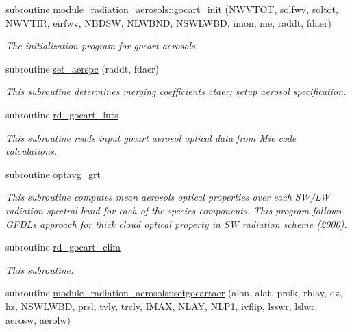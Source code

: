 \textbf{ }\par
\begin{DoxyCompactItemize}
\item 
subroutine \hyperlink{group__module__radiation__aerosols_ga579538840d4d8c86efa155b788c14ae3}{module\+\_\+radiation\+\_\+aerosols\+::gocart\+\_\+init} (N\+W\+V\+T\+OT, solfwv, soltot, N\+W\+V\+T\+IR, eirfwv, N\+B\+D\+SW, N\+L\+W\+B\+ND, N\+S\+W\+L\+W\+BD, imon, me, raddt, fdaer)
\begin{DoxyCompactList}\small\item\em The initialization program for gocart aerosols. \end{DoxyCompactList}\item 
subroutine \hyperlink{group__module__radiation__aerosols_gafb13b833ac59cf949702bdbde93d2c44}{set\+\_\+aerspc} (raddt, fdaer)
\begin{DoxyCompactList}\small\item\em This subroutine determines merging coefficients ctaer; setup aerosol specification. \end{DoxyCompactList}\item 
subroutine \hyperlink{group__module__radiation__aerosols_ga8b6a882f91674d1c0f7f71f297a5f92e}{rd\+\_\+gocart\+\_\+luts}
\begin{DoxyCompactList}\small\item\em This subroutine reads input gocart aerosol optical data from Mie code calculations. \end{DoxyCompactList}\item 
subroutine \hyperlink{group__module__radiation__aerosols_ga8d1f5010e8cbc6abda50b8fc233ad7e9}{optavg\+\_\+grt}
\begin{DoxyCompactList}\small\item\em This subroutine computes mean aerosols optical properties over each S\+W/\+LW radiation spectral band for each of the species components. This program follows G\+F\+DL\textquotesingle{}s approach for thick cloud optical property in SW radiation scheme (2000). \end{DoxyCompactList}\item 
subroutine \hyperlink{group__module__radiation__aerosols_ga15bad8499ffd17d967e5788cd6721c4d}{rd\+\_\+gocart\+\_\+clim}
\begin{DoxyCompactList}\small\item\em This subroutine\+: \end{DoxyCompactList}\item 
subroutine \hyperlink{group__module__radiation__aerosols_ga04ce3c11b81d0a0b025f79c4f29acfb8}{module\+\_\+radiation\+\_\+aerosols\+::setgocartaer} (alon, alat, prslk, rhlay, dz, hz, N\+S\+W\+L\+W\+BD, prsl, tvly, trcly, I\+M\+AX, N\+L\+AY, N\+L\+P1, ivflip, lsswr, lslwr, aerosw, aerolw)

\end{DoxyCompactItemize}
